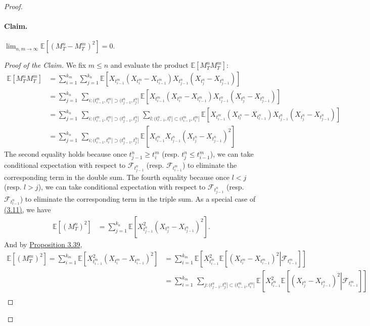 \documentclass{article}
\numberwithin{equation}{section}
\newcommand{\E}{\mathbb{E}}
\theoremstyle{plain}
\theoremstyle{definition}
\begin{document}
\begin{proof}
\paragraph{Claim.\label{claim:3.57}} $\lim_{n,m\to\infty}\E\left[(M_T^n-M_T^m)^2\right] = 0$.
\begin{proof}[Proof of the Claim]
We fix $m\leq n$ and evaluate the product $\E[M_T^nM_T^m]$:
\begin{align*}
	\E[M_T^nM_T^m] &= \sum_{i=1}^{k_m}\sum_{j=1}^{k_n}\E\left[X_{t_{i-1}^m}\left(X_{t_i^m}-X_{t_{i-1}^m}\right)X_{t_{j-1}^n}\left(X_{t_j^n}-X_{t_{j-1}^n}\right)\right]\\
	&=\sum_{j=1}^{k_n}\,\sum_{i:(t_{i-1}^m,t_i^m]\supset(t_{j-1}^n,t_j^n]}\E\left[X_{t_{i-1}^m}\left(X_{t_i^m}-X_{t_{i-1}^m}\right)X_{t_{j-1}^n}\left(X_{t_j^n}-X_{t_{j-1}^n}\right)\right]\\
	&=\sum_{j=1}^{k_n}\,\sum_{i:(t_{i-1}^m,t_i^m]\supset(t_{j-1}^n,t_j^n]}\,\sum_{l:(t_{l-1}^n,t_l^n]\subset(t_{i-1}^m,t_i^m]}\E\left[X_{t_{i-1}^m}\left(X_{t_l^n}-X_{t_{l-1}^n}\right)X_{t_{j-1}^n}\left(X_{t_j^n}-X_{t_{j-1}^n}\right)\right]\\
	&=\sum_{j=1}^{k_n}\,\sum_{i:(t_{i-1}^m,t_i^m]\supset(t_{j-1}^n,t_j^n]}\E\left[X_{t_{i-1}^m}X_{t_{j-1}^n}\left(X_{t_j^n}-X_{t_{j-1}^n}\right)^2\right]\tag{3.11}\label{eq:3.11}
\end{align*}
The second equality holds because once $t_{j-1}^n\geq t_i^m$ (resp. $t_j^n\leq t_{i-1}^m$), we can take conditional expectation with respect to $\mathscr{F}_{t_{j-1}^n}$ (resp. $\mathscr{F}_{t_{i-1}^m}$) to eliminate the corresponding term in the double sum. The fourth equality because once $l<j$ (resp. $l>j$), we can take conditional expectation with respect to $\mathscr{F}_{t_{j-1}^n}$ (resp. $\mathscr{F}_{t_{l-1}^n}$) to eliminate the corresponding term in the triple sum. As a special case of \hyperref[eq:3.11]{(3.11)}, we have
\begin{align*}
	\E\left[(M_T^n)^2\right] &= \sum_{j=1}^{k_n}\E\left[X_{t_{j-1}^n}^2\left(X_{t_j^n}-X_{t_{j-1}^n}\right)^2\right].\tag{3.12}\label{eq:3.12}
\end{align*}
And by \hyperref[prop:3.39]{Proposition 3.39},
\begin{align*}
	\E\left[(M_T^m)^2\right] = \sum_{i=1}^{k_m}\E\left[X_{t_{i-1}^m}^2\left(X_{t_i^m}-X_{t_{i-1}^m}\right)^2\right] &=\sum_{i=1}^{k_m}\E\left[X_{t_{i-1}^m}^2\E\left[\left.\left(X_{t_i^m}-X_{t_{i-1}^m}\right)^2\right|\mathscr{F}_{t_{i-1}^m}\right]\right]\\
	&= \sum_{i=1}^{k_m}\,\sum_{j:(t_{j-1}^n,t_j^n]\subset(t_{i-1}^m,t_i^m]}\E\left[X_{t_{i-1}^m}^2\E\left[\left.\left(X_{t_j^n}-X_{t_{j-1}^n}\right)^2\right|\mathscr{F}_{t_{i-1}^m}\right]\right]\\

\end{align*}
\end{proof}
\end{proof}
\end{document}
